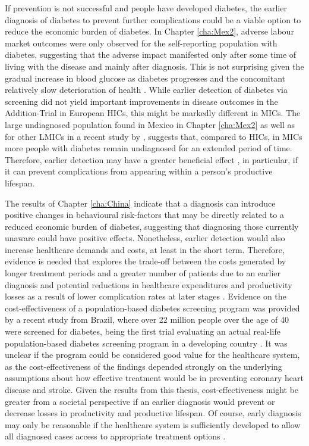 If prevention is not successful and people have developed diabetes, the earlier diagnosis of diabetes to prevent further complications could be a viable option to reduce the economic burden of diabetes. In Chapter \ref{cha:Mex2}, adverse labour market outcomes were only observed for the self-reporting population with diabetes, suggesting that the adverse impact manifested only after some time of living with the disease and mainly after diagnosis. This is not surprising given the gradual increase in blood glucose as diabetes progresses and the concomitant relatively slow deterioration of health \parencite{Bertram2010}. While earlier detection of diabetes via screening did not yield important improvements in disease outcomes in the Addition-Trial in European \acp{HIC}, this might be markedly different in \acp{MIC}. The large undiagnosed population found in Mexico in Chapter \ref{cha:Mex2} as well as for other \acp{LMIC} in a recent study by \textcite{Beagley2014}, suggests that, compared to \acp{HIC}, in \acp{MIC} more people with diabetes remain undiagnosed for an extended period of time. Therefore, earlier detection may have a greater beneficial effect  \parencite{Choukem2013}, in particular, if it can prevent complications from appearing within a person's productive lifespan. 

The results of Chapter \ref{cha:China} indicate that a diagnosis can introduce positive changes in behavioural risk-factors that may be directly related to a reduced economic burden of diabetes, suggesting that diagnosing those currently unaware could have positive effects. Nonetheless, earlier detection would also increase healthcare demands and costs, at least in the short term. Therefore, evidence is needed that explores the trade-off between the costs generated by longer treatment periods and a greater number of patients due to an earlier diagnosis and potential reductions in healthcare expenditures and productivity losses as a result of lower complication rates at later stages \parencite{Engelgau2012}. Evidence on the cost-effectiveness of a population-based diabetes screening program was provided by a recent study from Brazil, where over 22 million people over the age of 40 were screened for diabetes, being the first trial evaluating an actual real-life population-based diabetes screening program in a developing country \parencite{Toscano2015}. It was unclear if the program could be considered good value for the healthcare system, as the cost-effectiveness of the findings depended strongly on the underlying assumptions about how effective treatment would be in preventing coronary heart disease and stroke. Given the results from this thesis, cost-effectiveness might be greater from a societal perspective if an earlier diagnosis would prevent or decrease losses in productivity and productive lifespan. Of course, early diagnosis may only be reasonable if the healthcare system is sufficiently developed to allow all diagnosed cases access to appropriate treatment options \parencite{Toscano2015,Engelgau2012}. 

